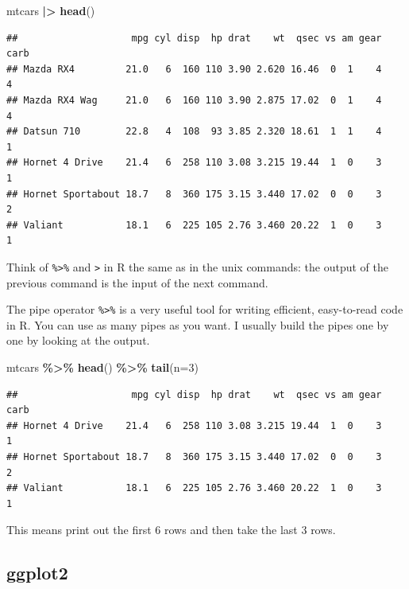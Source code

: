 \documentclass[
]{book}
\newenvironment{Shaded}{\begin{snugshade}}{\end{snugshade}}
\newcommand{\AttributeTok}[1]{\textcolor[rgb]{0.13,0.29,0.53}{#1}}
\newcommand{\DecValTok}[1]{\textcolor[rgb]{0.00,0.00,0.81}{#1}}
\newcommand{\FunctionTok}[1]{\textcolor[rgb]{0.13,0.29,0.53}{\textbf{#1}}}
\newcommand{\NormalTok}[1]{#1}
\newcommand{\SpecialCharTok}[1]{\textcolor[rgb]{0.81,0.36,0.00}{\textbf{#1}}}
\begin{document}
\begin{Shaded}
\begin{Highlighting}[]
\NormalTok{mtcars }\SpecialCharTok{|\textgreater{}}
  \FunctionTok{head}\NormalTok{()}
\end{Highlighting}
\end{Shaded}

\begin{verbatim}
##                    mpg cyl disp  hp drat    wt  qsec vs am gear carb
## Mazda RX4         21.0   6  160 110 3.90 2.620 16.46  0  1    4    4
## Mazda RX4 Wag     21.0   6  160 110 3.90 2.875 17.02  0  1    4    4
## Datsun 710        22.8   4  108  93 3.85 2.320 18.61  1  1    4    1
## Hornet 4 Drive    21.4   6  258 110 3.08 3.215 19.44  1  0    3    1
## Hornet Sportabout 18.7   8  360 175 3.15 3.440 17.02  0  0    3    2
## Valiant           18.1   6  225 105 2.76 3.460 20.22  1  0    3    1
\end{verbatim}

Think of \texttt{\%\textgreater{}\%} and \texttt{\textbar{}\textgreater{}} in R the same as \texttt{\textbar{}} in the unix commands: the output of the previous command is the input of the next command.

The pipe operator \texttt{\%\textgreater{}\%} is a very useful tool for writing efficient, easy-to-read code in R. You can use as many pipes as you want. I usually build the pipes one by one by looking at the output.

\begin{Shaded}
\begin{Highlighting}[]
\NormalTok{mtcars }\SpecialCharTok{\%\textgreater{}\%} 
  \FunctionTok{head}\NormalTok{() }\SpecialCharTok{\%\textgreater{}\%} 
  \FunctionTok{tail}\NormalTok{(}\AttributeTok{n=}\DecValTok{3}\NormalTok{)}
\end{Highlighting}
\end{Shaded}

\begin{verbatim}
##                    mpg cyl disp  hp drat    wt  qsec vs am gear carb
## Hornet 4 Drive    21.4   6  258 110 3.08 3.215 19.44  1  0    3    1
## Hornet Sportabout 18.7   8  360 175 3.15 3.440 17.02  0  0    3    2
## Valiant           18.1   6  225 105 2.76 3.460 20.22  1  0    3    1
\end{verbatim}

This means print out the first 6 rows and then take the last 3 rows.

\hypertarget{ggplot2}{%
\subsection{ggplot2}\label{ggplot2}}
\end{document}
